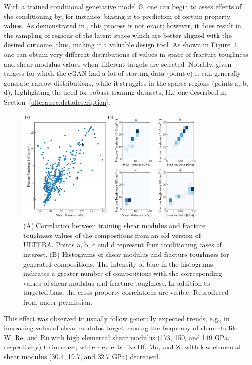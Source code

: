 With a trained conditional generative model $\mathbb{G}$, one can begin to asses effects of the conditioning by, for instance, biasing it to prediction of certain property values. As demonstrated in \citet{Debnath2021GenerativeAlloys}, this process is not exact; however, it does result in the sampling of regions of the latent space which are better aligned with the desired outcome, thus, making it a valuable design tool. As shown in Figure~\ref{inverse:fig:propbias}, one can obtain very different distributions of values in space of fracture toughness and shear modulus values when different targets are selected. Notably, given targets for which the cGAN had a lot of starting data (point c) it can generally generate narrow distributions, while it struggles in the sparse regions (points a, b, d), highlighting the need for robust training datasets, like one described in Section~\ref{ultera:sec:datadescription}.

\begin{figure}[H]
    \centering
    \includegraphics[width=0.85\textwidth]{inversedesign/fixed_cond_multi_points.pdf}
    \caption{(A) Correlation between training shear modulus and fracture toughness values of the compositions from an old version of ULTERA. Points a, b, c and d represent four conditioning cases of interest. (B) Histograms of shear modulus and fracture toughness for generated compositions. The intensity of blue in the histograms indicates a greater number of compositions with the corresponding values of shear modulus and fracture toughness. In addition to targeted bias, the cross-property correlations are visible. Reproduced from \cite{Debnath2021GenerativeAlloys} under permission.}
    \label{inverse:fig:propbias}
\end{figure}

This effect was observed to usually follow generally expected trends, e.g., in increasing value of shear modulus target causing the frequency of elements like W, Re, and Ru with high elemental shear modulus (173, 150, and 149 GPa, respectively) to increase, while elements like Hf, Mo, and Zr with low elemental shear modulus (30.4, 19.7, and 32.7 GPa) decreased.


